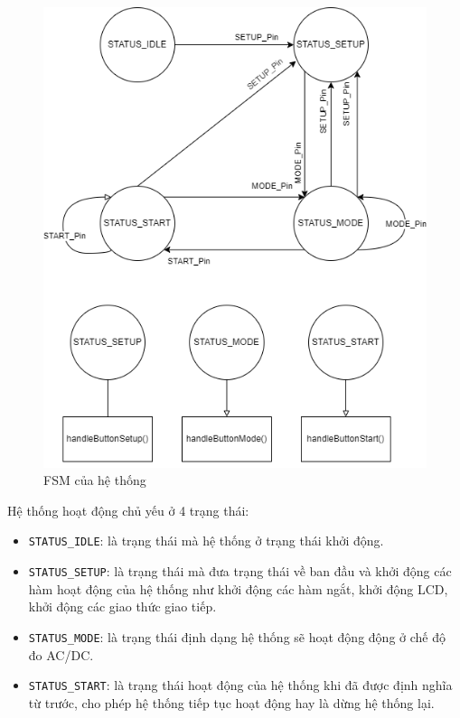 \begin{figure}[H]
	\centering
	\includegraphics[width=0.7\linewidth]{./diagram/fsm.drawio.png}
	\caption{FSM của hệ thống}
	\label{f_fsm system}
\end{figure}

Hệ thống hoạt động chủ yếu ở 4 trạng thái:

\begin{itemize}[label = -]
	\item \texttt{STATUS\_IDLE}: là trạng thái mà hệ thống ở trạng thái khởi động.
	\item \texttt{STATUS\_SETUP}: là trạng thái mà đưa trạng thái về ban đầu và khởi động các hàm hoạt động của hệ thống như khởi động các hàm ngắt, khởi động LCD, khởi động các giao thức giao tiếp.
	\item \texttt{STATUS\_MODE}: là trạng thái định dạng hệ thống sẽ hoạt động động ở chế độ đo AC/DC.
	\item \texttt{STATUS\_START}: là trạng thái hoạt động của hệ thống khi đã được định nghĩa từ trước, cho phép hệ thống tiếp tục hoạt động hay là dừng hệ thống lại.
\end{itemize}

